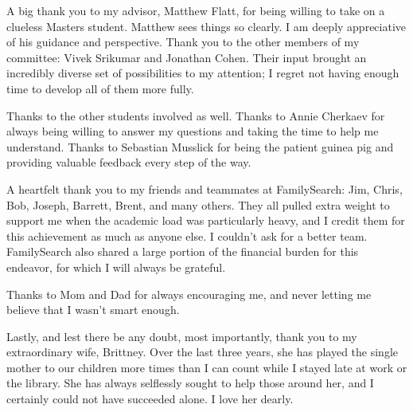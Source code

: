

A big thank you to my advisor, Matthew Flatt, for being willing to take on a clueless Masters student. Matthew sees things so clearly. I am deeply appreciative of his guidance and perspective. Thank you to the other members of my committee: Vivek Srikumar and Jonathan Cohen. Their input brought an incredibly diverse set of possibilities to my attention; I regret not having enough time to develop all of them more fully.

Thanks to the other students involved as well. Thanks to Annie Cherkaev for always being willing to answer my questions and taking the time to help me understand. Thanks to Sebastian Musslick for being the patient guinea pig and providing valuable feedback every step of the way.

A heartfelt thank you to my friends and teammates at FamilySearch: Jim, Chris, Bob, Joseph, Barrett, Brent, and many others. They all pulled extra weight to support me when the academic load was particularly heavy, and I credit them for this achievement as much as anyone else. I couldn't ask for a better team. FamilySearch also shared a large portion of the financial burden for this endeavor, for which I will always be grateful.

Thanks to Mom and Dad for always encouraging me, and never letting me believe that I wasn't smart enough.

Lastly, and lest there be any doubt, most importantly, thank you to my extraordinary wife, Brittney. Over the last three years, she has played the single mother to our children more times than I can count while I stayed late at work or the library. She has always selflessly sought to help those around her, and I certainly could not have succeeded alone. I love her dearly.


